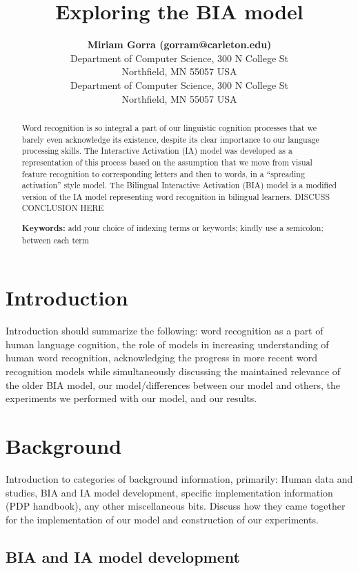\documentclass[10pt,letterpaper]{article}
\title{Exploring the BIA model}
\author{{\large \bf Miriam Gorra (gorram@carleton.edu)} \\
Department of Computer Science, 300 N College St \\
Northfield, MN 55057 USA
\AND {\large \bf William Maxon Bremer (bremerw@carleton.edu)} \\
Department of Computer Science, 300 N College St \\
Northfield, MN 55057 USA}
\begin{document}
\maketitle


\begin{abstract}
Word recognition is so integral a part of our linguistic cognition processes that we barely even acknowledge its existence, despite its clear importance to our language processing skills. The Interactive Activation (IA) model \cite{MclellandRumelhart1981a} was developed as a representation of this process based on the assumption that we move from visual feature recognition to corresponding letters and then to words, in a “spreading activation” style model. The Bilingual Interactive Activation (BIA) model \cite{DijkstraVanheuven1998a} is a modified version of the IA model representing word recognition in bilingual learners. DISCUSS CONCLUSION HERE


\textbf{Keywords:}
add your choice of indexing terms or keywords; kindly use a
semicolon; between each term
\end{abstract}


\section{Introduction}

Introduction should summarize the following: word recognition as a part of human language cognition, the role of models in increasing understanding of human word recognition, acknowledging the progress in more recent word recognition models while simultaneously discussing the maintained relevance of the older BIA model, our model/differences between our model and others, the experiments we performed with our model, and our results.


\section{Background}

Introduction to categories of background information, primarily: Human data and studies, BIA and IA model development, specific implementation information (PDP handbook), any other miscellaneous bits. Discuss how they came together for the implementation of our model and construction of our experiments.


\subsection{BIA and IA model development}
\end{document}

